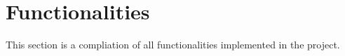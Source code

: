 \section{Functionalities}
This section is a compliation of all functionalities implemented in the project.










